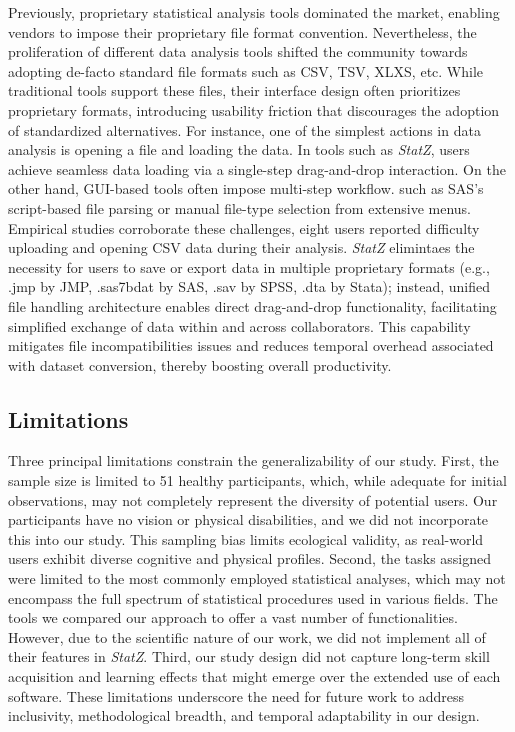 \documentclass{article}
\begin{document}
Previously, proprietary statistical analysis tools dominated the market, enabling vendors to impose their proprietary file format convention. Nevertheless, the proliferation of different data analysis tools shifted the community towards adopting de-facto standard file formats such as CSV, TSV, XLXS, etc. While traditional tools support these files, their interface design often prioritizes proprietary formats, introducing usability friction that discourages the adoption of standardized alternatives. For instance, one of the simplest actions in data analysis is opening a file and loading the data. In tools such as \textit{StatZ}, users achieve seamless data loading via a single-step drag-and-drop interaction. On the other hand, GUI-based tools often impose multi-step workflow. such as SAS’s script-based file parsing or manual file-type selection from extensive menus. Empirical studies corroborate these challenges, eight users reported difficulty uploading and opening CSV data during their analysis. \textit{StatZ} elimintaes the necessity for users to save or export data in multiple proprietary formats (e.g., .jmp by JMP, .sas7bdat by SAS, .sav by SPSS, .dta by Stata); instead, unified file handling architecture enables direct drag-and-drop functionality, facilitating simplified exchange of data within and across collaborators. This capability mitigates file incompatibilities issues and reduces temporal overhead associated with dataset conversion, thereby boosting overall productivity. 

\subsection{Limitations}
Three principal limitations constrain the generalizability of our study. First, the sample size is limited to 51 healthy participants, which, while adequate for initial observations, may not completely represent the diversity of potential users. Our participants have no vision or physical disabilities, and we did not incorporate this into our study. This sampling bias limits ecological validity, as real-world users exhibit diverse cognitive and physical profiles. Second, the tasks assigned were limited to the most commonly employed statistical analyses, which may not encompass the full spectrum of statistical procedures used in various fields. The tools we compared our approach to offer a vast number of functionalities. However, due to the scientific nature of our work, we did not implement all of their features in \textit{StatZ}. Third, our study design did not capture long-term skill acquisition and learning effects that might emerge over the extended use of each software. These limitations underscore the need for future work to address inclusivity, methodological breadth, and temporal adaptability in our design.
\end{document}
